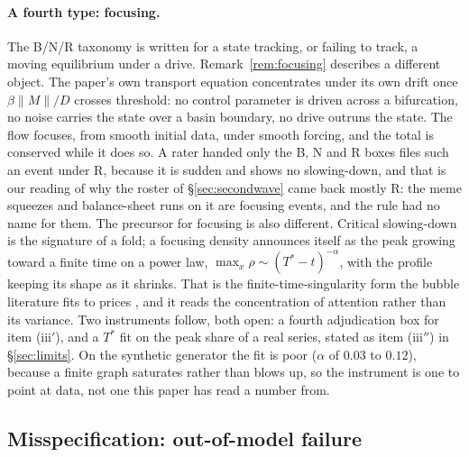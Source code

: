\documentclass[11pt]{article}
\begin{document}
\paragraph{A fourth type: focusing.} The B/N/R taxonomy is written for a state tracking, or failing to track, a moving equilibrium under a drive. Remark~\ref{rem:focusing} describes a different object. The paper's own transport equation concentrates under its own drift once $\beta\lVert M\rVert/D$ crosses threshold: no control parameter is driven across a bifurcation, no noise carries the state over a basin boundary, no drive outruns the state. The flow focuses, from smooth initial data, under smooth forcing, and the total is conserved while it does so. A rater handed only the B, N and R boxes files such an event under R, because it is sudden and shows no slowing-down, and that is our reading of why the roster of \S\ref{sec:secondwave} came back mostly R: the meme squeezes and balance-sheet runs on it are focusing events, and the rule had no name for them. The precursor for focusing is also different. Critical slowing-down is the signature of a fold; a focusing density announces itself as the peak growing toward a finite time on a power law, $\max_x\rho \sim (T^\ast - t)^{-\alpha}$, with the profile keeping its shape as it shrinks. That is the finite-time-singularity form the bubble literature fits to prices \cite{johansenledoitsornette2000,sornette2003}, and it reads the concentration of attention rather than its variance. Two instruments follow, both open: a fourth adjudication box for item (iii$'$), and a $T^\ast$ fit on the peak share of a real series, stated as item (iii$''$) in \S\ref{sec:limits}. On the synthetic generator the fit is poor ($\alpha$ of $0.03$ to $0.12$), because a finite graph saturates rather than blows up, so the instrument is one to point at data, not one this paper has read a number from.

\subsection{Misspecification: out-of-model failure}
\label{sec:mule}
\end{document}
